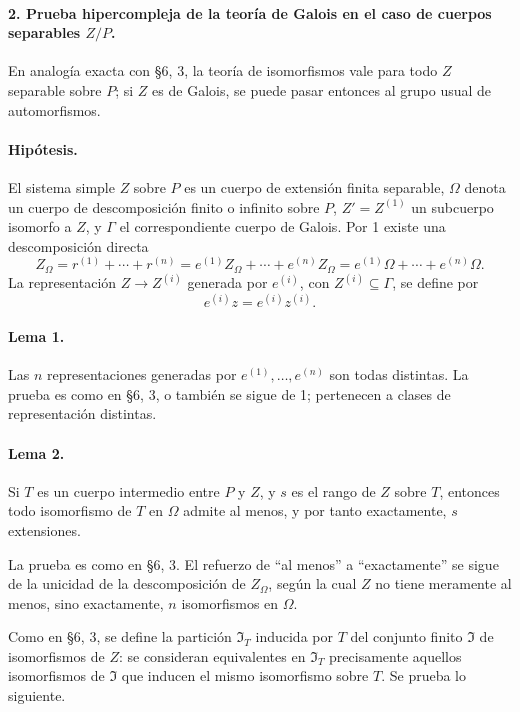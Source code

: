 \paragraph{2. Prueba hipercompleja de la teoría de Galois en el caso de cuerpos separables \(Z/P\).}
En analogía exacta con §6, 3, la teoría de isomorfismos vale para todo \(Z\) separable sobre \(P\); si \(Z\) es de Galois, se puede pasar entonces al grupo usual de automorfismos.

\paragraph{Hipótesis.}
El sistema simple \(Z\) sobre \(P\) es un cuerpo de extensión finita separable, \(\Omega\) denota un cuerpo de descomposición finito o infinito sobre \(P\), \(Z'=Z^{(1)}\) un subcuerpo isomorfo a \(Z\), y \(\Gamma\) el correspondiente cuerpo de Galois. Por 1 existe una descomposición directa
\[
        Z_\Omega=r^{(1)}+\cdots+r^{(n)}
        =e^{(1)}Z_\Omega+\cdots+e^{(n)}Z_\Omega
        =e^{(1)}\Omega+\cdots+e^{(n)}\Omega .
\]
La representación \(Z\to Z^{(i)}\) generada por \(e^{(i)}\), con \(Z^{(i)}\subseteq\Gamma\), se define por
\[
        e^{(i)}z=e^{(i)}z^{(i)}.
\]

\paragraph{Lema 1.}
Las \(n\) representaciones generadas por \(e^{(1)},\ldots,e^{(n)}\) son todas distintas. La prueba es como en §6, 3, o también se sigue de 1; pertenecen a clases de representación distintas.

\paragraph{Lema 2.}
Si \(T\) es un cuerpo intermedio entre \(P\) y \(Z\), y \(s\) es el rango de \(Z\) sobre \(T\), entonces todo isomorfismo de \(T\) en \(\Omega\) admite al menos, y por tanto exactamente, \(s\) extensiones.

La prueba es como en §6, 3. El refuerzo de “al menos” a “exactamente” se sigue de la unicidad de la descomposición de \(Z_\Omega\), según la cual \(Z\) no tiene meramente al menos, sino exactamente, \(n\) isomorfismos en \(\Omega\).

Como en §6, 3, se define la partición \(\mathfrak I_T\) inducida por \(T\) del conjunto finito \(\mathfrak I\) de isomorfismos de \(Z\): se consideran equivalentes en \(\mathfrak I_T\) precisamente aquellos isomorfismos de \(\mathfrak I\) que inducen el mismo isomorfismo sobre \(T\). Se prueba lo siguiente.

